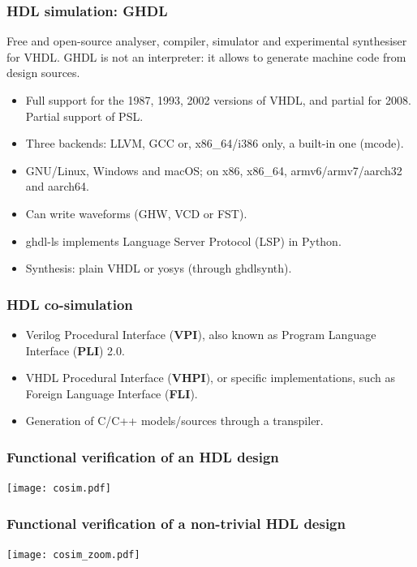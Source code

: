 \documentclass{beamer}
\begin{document}
\begin{frame}
\frametitle{HDL simulation: GHDL}
\small Free and open-source  analyser, compiler, simulator and experimental synthesiser for VHDL. GHDL is not an interpreter: it allows to generate machine code from design sources.
\vspace{1em}
\begin{itemize}
  \item Full support for the 1987, 1993, 2002 versions of VHDL, and partial for 2008. Partial support of PSL.
  \item Three backends: LLVM, GCC or, x86\_64/i386 only, a built-in one (mcode).
  \item GNU/Linux, Windows and macOS; on x86, x86\_64, armv6/armv7/aarch32 and aarch64.
  \item Can write waveforms (GHW, VCD or FST).
  \item ghdl-ls implements Language Server Protocol (LSP) in Python.
  \item Synthesis: plain VHDL or yosys (through ghdlsynth).
\end{itemize}
\end{frame}

\begin{frame}
\frametitle{HDL co-simulation}
\begin{itemize}
  \item Verilog Procedural Interface (\textbf{VPI}), also known as Program Language Interface (\textbf{PLI}) 2.0.
\end{itemize}
\vspace{1em}
\begin{itemize}
  \item VHDL Procedural Interface (\textbf{VHPI}), or specific implementations, such as Foreign Language Interface (\textbf{FLI}).
\end{itemize}
\vspace{1em}
\begin{itemize}
  \item Generation of C/C++ models/sources through a transpiler.
\end{itemize}
\end{frame}

\begin{frame}
\frametitle{Functional verification of an HDL design}
\centering
\texttt{[image: cosim.pdf]}
\end{frame}

\begin{frame}
\frametitle{Functional verification of a non-trivial HDL design}
\centering
\texttt{[image: cosim\_zoom.pdf]}
\end{frame}
\end{document}
